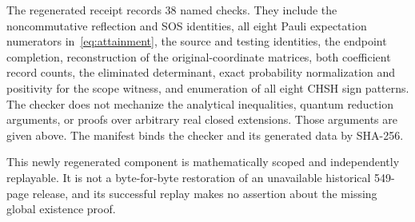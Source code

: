 The regenerated receipt records 38 named checks. They include the noncommutative reflection and SOS identities, all eight Pauli expectation numerators in~\eqref{eq:attainment}, the source and testing identities, the endpoint completion, reconstruction of the original-coordinate matrices, both coefficient record counts, the eliminated determinant, exact probability normalization and positivity for the scope witness, and enumeration of all eight CHSH sign patterns. The checker does not mechanize the analytical inequalities, quantum reduction arguments, or proofs over arbitrary real closed extensions. Those arguments are given above. The manifest binds the checker and its generated data by SHA-256.

This newly regenerated component is mathematically scoped and independently replayable. It is not a byte-for-byte restoration of an unavailable historical 549-page release, and its successful replay makes no assertion about the missing global existence proof.
